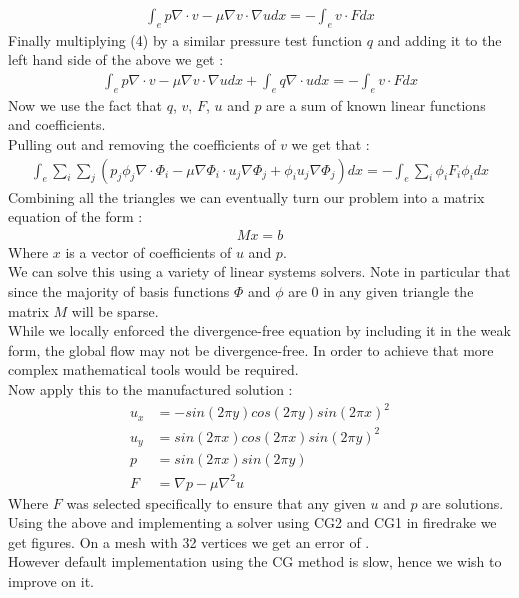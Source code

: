 \documentclass[11pt,twoside,a4paper]{article}
\begin{document}
\begin{align*}
\int_{e} p \nabla \cdot v - \mu \nabla v \cdot \nabla u dx = -\int_{e} v \cdot F dx
\end{align*}
Finally multiplying (4) by a similar pressure test function $q$ and adding it to the left hand side of the above we get :
\begin{align}
\int_{e} p \nabla \cdot v - \mu \nabla v \cdot \nabla u dx + \int_{e} q \nabla \cdot u dx = -\int_{e} v \cdot F dx
\end{align}
Now we use the fact that $q$, $v$, $F$, $u$ and $p$ are a sum of known linear functions and coefficients.\\
Pulling out and removing the coefficients of $v$ we get that :
\begin{align*}
 \int_{e} \sum_i \sum_j (  p_j \phi_j \nabla  \cdot \Phi_i - \mu \nabla \Phi_i \cdot u_j \nabla \Phi_j +   \phi_i u_j \nabla \Phi_j) dx = -\int_{e} \sum_i \phi_i F_i \phi_i dx
\end{align*}
Combining all the triangles we can eventually turn our problem into a matrix equation of the form :
\begin{align}
M x = b
\end{align}
Where $x$ is a vector of coefficients of $u$ and $p$.\\
We can solve this using a variety of linear systems solvers. Note in particular that since the majority of basis functions $\Phi$ and $\phi$ are $0$ in any given triangle the matrix $M$ will be sparse.\\
While we locally enforced the divergence-free equation by including it in the weak form, the global flow may not be divergence-free. In order to achieve that more complex mathematical tools would be required.\\
Now apply this to the manufactured solution :
\begin{align*}
u_x &=  -sin(2 \pi y) cos(2 \pi y)  sin(2 \pi x)^2 \\
u_y &= sin(2 \pi x) cos(2 \pi x)  sin(2 \pi y)^2 \\
p &= sin(2 \pi x) sin(2 \pi y) \\
F &= \nabla p - \mu \nabla^2 u
\end{align*}
Where $F$ was selected specifically to ensure that any given $u$ and $p$ are solutions.
Using the above and implementing a solver using CG2 and CG1 in firedrake we get figures. On a mesh with 32 vertices we get an error of .\\
However default implementation using the CG method is slow, hence we wish to improve on it.
\end{document}
